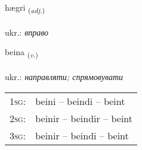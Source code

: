 \documentclass[frontgrid, backgrid]{flacards}\usepackage[]{graphicx}\usepackage[]{xcolor}
\begin{document}
\renewcommand{\flhead}{\vskip5pt \fboxsep=0pt {\small\bfseries\footnotesize Lýsingarorð | прикметник}}
\renewcommand{\fcfoot}{\vskip5pt \fboxsep=0pt \hspace{2pt}{\small\bfseries\footnotesize 2K}}

\renewcommand{\blhead}{\vskip5pt {\small\bfseries\footnotesize Lýsingarorð | прикметник }}
\renewcommand{\bcfoot}{\vskip5pt \hspace{2pt}{\small\bfseries\footnotesize 2K}}


{hægri \small{\textsubscript{(\textit{adj.})}} \\[1ex] %
\textphonetic{[haiɣrɪ]} \\
ukr.: \emph{вправо} \\  [2ex]
\renewcommand*{\arraystretch}{0.8}
}

\renewcommand{\flhead}{\vskip5pt \fboxsep=0pt {\small\bfseries\footnotesize Sagnorð | дієслово}}
\renewcommand{\fcfoot}{\vskip5pt \fboxsep=0pt \hspace{2pt}{\small\bfseries\footnotesize 2K}}

\renewcommand{\blhead}{\vskip5pt {\small\bfseries\footnotesize Sagnorð | дієслово }}
\renewcommand{\bcfoot}{\vskip5pt \hspace{2pt}{\small\bfseries\footnotesize 2K}}


{beina \small{\textsubscript{(\textit{v.})}} \\[1ex] %
\textphonetic{[peiːna]} \\
ukr.: \emph{направляти; спрямовувати} \\  [2ex]
\renewcommand*{\arraystretch}{0.8}
\begin{tabular}{p{1cm}l}
\textsc{1sg}: & beini -- beindi -- beint \\ 
\textsc{2sg}: & beinir -- beindir -- beint \\ 
\textsc{3sg}: & beinir -- beindi -- beint \\ 
\end{tabular}
}
\end{document}
